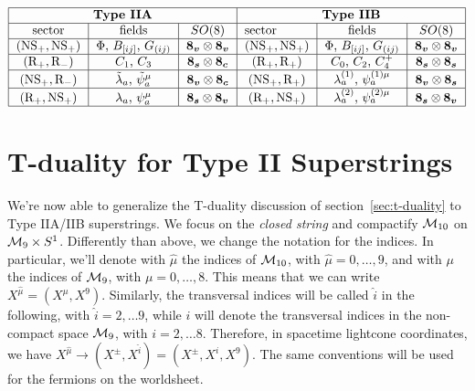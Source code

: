 \begin{equation*}
        \begin{tabular}{|ccc|ccc|}
        \hline
        \multicolumn{3}{|c|}{\textbf{Type IIA}} & \multicolumn{3}{c|}{\textbf{Type IIB}} \\ \hline
        \multicolumn{1}{|c|}{sector}  & fields & \multicolumn{1}{|c|}{$SO(8)$} & \multicolumn{1}{l|}{sector}  & fields & \multicolumn{1}{|c|}{$SO(8)$}  \\ \hline
        \multicolumn{1}{|c|}{$(\text{NS}_+, \text{NS}_+)$} & $\Phi$, $B_{[ij]}$, $G_{(ij)}$ & \multicolumn{1}{|c|}{$\v \otimes \v$} & \multicolumn{1}{c|}{$(\text{NS}_+, \text{NS}_+)$}        &      $\Phi$, $B_{[ij]}$, $G_{(ij)}$  & \multicolumn{1}{|c|}{$\v \otimes \v$} \\ \hline
        \multicolumn{1}{|c|}{$(\text{R}_+, \text{R}_-)$} &$C_1$, $C_3$  & \multicolumn{1}{|c|}{$\s\otimes\c$} & \multicolumn{1}{c|}{$(\text{R}_+, \text{R}_+)$}        &    $C_0$, $C_2$, $C_4^+$   & \multicolumn{1}{|c|}{$\s\otimes\s$}  \\ \hline
        \multicolumn{1}{|c|}{$(\text{NS}_+,\text{R}_-)$}        &     $\tilde{\lambda}_a$, $\tilde{\psi}^\mu_a$  & \multicolumn{1}{|c|}{$\v\otimes\c$}  & \multicolumn{1}{c|}{$(\text{NS}_+,\text{R}_+)$}        &     ${\lambda}^{(1)}_a$, ${\psi}^{(1)\mu}_a$  & \multicolumn{1}{|c|}{$\v\otimes\s$}  \\ \hline


        \multicolumn{1}{|c|}{$(\text{R}_+, \text{NS}_+)$}        &     ${\lambda}_a$, ${\psi}^\mu_a$ & \multicolumn{1}{|c|}{$\s\otimes\v$}   & \multicolumn{1}{c|}{$(\text{R}_+, \text{NS}_+)$}        &     ${\lambda}^{(2)}_a$, ${\psi}^{(2)\mu}_a$  & \multicolumn{1}{|c|}{$\s\otimes\v$}  \\ \hline
        \end{tabular}
\end{equation*}

\section{T-duality for Type II Superstrings}
We're now able to generalize the T-duality discussion of section~\ref{sec:t-duality} to Type IIA/IIB superstrings. We focus on the \emph{closed string} and compactify $\mathcal{M}_{10}$ on $\mathcal{M}_{9} \times S^1$. Differently than above, we change the notation for the indices. In particular, we'll denote with $\hat{\mu}$ the indices of $\mathcal{M}_{10}$, with $\hat{\mu} = 0, \dots, 9$, and with $\mu$ the indices of $\mathcal{M}_{9}$, with $\mu = 0, \dots , 8$. This means that we can write $X^{\hat{\mu}} = (X^\mu, X^{9})$. Similarly, the transversal indices will be called $\hat{i}$ in the following, with $\hat{i} = 2, \dots 9$, while $i$ will denote the transversal indices in the non-compact space $\mathcal{M}_{9}$, with $i = 2, \dots 8$. Therefore, in spacetime lightcone coordinates, we have $X^{\hat{\mu}} \to (X^\pm, X^{\hat{i}}) = (X^\pm, X^i, X^{9})$. The same conventions will be used for the fermions on the worldsheet.

